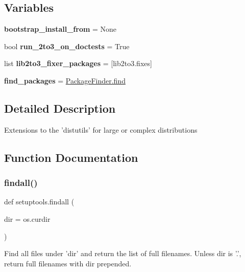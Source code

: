 \subsection*{Variables}
\begin{DoxyCompactItemize}
\item 
\mbox{\label{namespacesetuptools_a7d51d85e64a02e0808685340753eec38}} 
{\bfseries bootstrap\+\_\+install\+\_\+from} = None
\item 
\mbox{\label{namespacesetuptools_a579fb1acef3ca217a470e0a0a1659503}} 
bool {\bfseries run\+\_\+2to3\+\_\+on\+\_\+doctests} = True
\item 
\mbox{\label{namespacesetuptools_a2a9aa3f4107914fedf47fbf0b6c97620}} 
list {\bfseries lib2to3\+\_\+fixer\+\_\+packages} = \mbox{[}\textquotesingle{}lib2to3.\+fixes\textquotesingle{}\mbox{]}
\item 
\mbox{\label{namespacesetuptools_af3f752d8ed43dd0bf1640292cf7f2540}} 
{\bfseries find\+\_\+packages} = \hyperlink{classsetuptools_1_1_package_finder_a0ccdb7e47a8fbb515482bf3e6044e7ac}{Package\+Finder.\+find}
\end{DoxyCompactItemize}


\subsection{Detailed Description}
\begin{DoxyVerb}Extensions to the 'distutils' for large or complex distributions\end{DoxyVerb}
 

\subsection{Function Documentation}
\mbox{\label{namespacesetuptools_a9d3e6b5f82f1d22fb1d7ad0daf6018f6}} 
\subsubsection{\texorpdfstring{findall()}{findall()}}
{\footnotesize\ttfamily def setuptools.\+findall (\begin{DoxyParamCaption}\item[{}]{dir = {\ttfamily os.curdir} }\end{DoxyParamCaption})}

\begin{DoxyVerb}Find all files under 'dir' and return the list of full filenames.
Unless dir is '.', return full filenames with dir prepended.
\end{DoxyVerb}
 